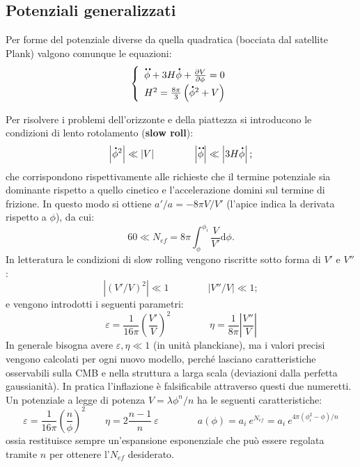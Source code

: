 \subsection{Potenziali generalizzati}\label{ch5:epsieta}
Per forme del potenziale diverse da quella quadratica (bocciata dal satellite Plank) valgono comunque le equazioni:
\begin{equation*}\left\{
    \def\arraystretch{1.5}
        \begin{array}{ll}
            \ddt{\phi} + 3H \dt{\phi} + \frac{\partial V}{\partial \phi} =0\\ 
            H^2 = \frac{8\pi}{3} \left(\dt{\phi}^2+V\right)
    \end{array}\right.
\end{equation*}

Per risolvere i problemi dell'orizzonte e della piattezza si introducono le condizioni di lento rotolamento (\textbf{slow roll}):
\begin{equation}
    \left| \accentset{\mbox{\large\bfseries .}}{\phi}^2 \right| \ll \left| V \right|  \qquad\qquad \left| \accentset{\mbox{\large\bfseries ..}}{\phi} \right| \ll \left| 3H\accentset{\mbox{\large\bfseries .}}{\phi} \right|;
\end{equation}
che corrispondono rispettivamente alle richieste che il termine potenziale sia dominante rispetto a quello cinetico e l'accelerazione domini sul termine di frizione. In questo modo si ottiene $a'/a = -8\pi V/V'$ (l'apice indica la derivata rispetto a $\phi$), da cui:
\begin{equation}
    60 \ll N_{ef} = 8\pi \int_\phi^{\phi_i} \frac{V}{V'} \mathrm{d}\phi. 
\end{equation}
In letteratura le condizioni di slow rolling vengono riscritte sotto forma di $V'$ e $V''$:
\begin{equation}
    \left| \left( V'/V\right)^2 \right| \ll 1 \qquad\qquad \left|  V''/V \right| \ll 1;
\end{equation}
e vengono introdotti i seguenti parametri:
\begin{equation}
    \varepsilon = \frac{1}{16\pi}\left(\frac{V'}{V}\right)^2 \qquad\qquad \eta = \frac{1}{8\pi}\left|\frac{V''}{V}\right|
\end{equation}
In generale bisogna avere $\varepsilon, \eta \ll 1$ (in unità planckiane), ma i valori precisi vengono calcolati per ogni nuovo modello, perché lasciano caratteristiche osservabili sulla CMB e nella struttura a larga scala (deviazioni dalla perfetta gaussianità). In pratica l'inflazione è falsificabile attraverso questi due numeretti. Un potenziale a legge di potenza $V=\lambda \phi^n / n$ ha le seguenti caratteristiche:
\begin{equation}
    \varepsilon =   \frac{1}{16\pi} \left( \frac{n}{\phi}\right)^2 \qquad \eta= 2 \frac{n-1}{n} ~\varepsilon \qquad\qquad a(\phi)=a_i ~e^{N_{ef}} = a_i ~e^{4\pi(\phi_i^2-\phi)/n}
\end{equation}
ossia restituisce sempre un'espansione esponenziale che può essere regolata tramite $n$ per ottenere l'$N_{ef}$ desiderato.


